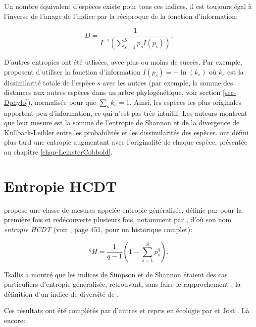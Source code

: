 \documentclass[
  11pt,
  french,
  a4paper,
  extrafontsizes,onecolumn,openright
  ]{memoir}
\begin{document}
Un nombre équivalent d'espèces existe pour tous ces indices, il est toujours égal à l'inverse de l'image de l'indice par la réciproque de la fonction d'information:

\begin{equation}
  \label{eq:Gregorius2014}
  D = \frac{1}{I^{-1}\left(\sum^S_{s=1}{p_s I(p_s)}\right)}.
\end{equation}

D'autres entropies ont été utlisées, avec plus ou moins de succès.
Par exemple, \textcite{Ricotta2003c} proposent d'utiliser la fonction d'information \(I(p_s)=-\ln(k_s)\) où \(k_s\) est la dissimilarité totale de l'espèce \(s\) avec les autres (par exemple, la somme des distances aux autres espèces dans un arbre phylogénétique, voir section \ref{sec-Dphylo}), normalisée pour que \(\sum_s{k_s}=1\).
Ainsi, les espèces les plus originales apportent peu d'information, ce qui n'est pas très intuitif.
Les auteurs montrent que leur mesure est la somme de l'entropie de Shannon et de la divergence de Kullback-Leibler entre les probabilités et les dissimilarités des espèces.
\textcite{Ricotta2006b} ont défini plus tard une entropie augmentant avec l'originalité de chaque espèce, présentée au chapitre \ref{chap-LeinsterCobbold}.

\section{Entropie HCDT}\label{entropie-hcdt}

\textcite{Tsallis1988} propose une classe de mesures appelée entropie généralisée, définie par \textcite{Havrda1967} pour la première fois et redécouverte plusieurs fois, notamment par \textcite{Daroczy1970}, d'où son nom \emph{entropie HCDT} (voir \textcite{Mendes2008}, page 451, pour un historique complet):

\begin{equation}
  \label{eq:HCDT}
  ^{q}\!H = \frac{1}{q-1}\left(1-\sum^S_{s=1}{p^q_s}\right).
\end{equation}

Tsallis a montré que les indices de Simpson et de Shannon étaient des cas particuliers d'entropie généralisée, retrouvant, sans faire le rapprochement \autocite{Ricotta2005}, la définition d'un indice de diversité de \textcite{Patil1982}.

Ces résultats ont été complétés par d'autres et repris en écologie par \textcite{Keylock2005} et Jost \autocite*{Jost2006,Jost2007}.
Là encore:
\end{document}
